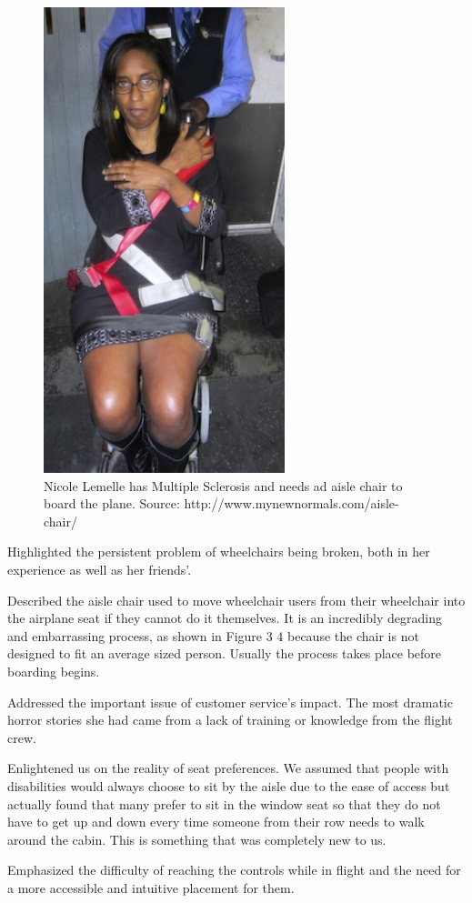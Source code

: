 \documentclass[a4paper, 12pt,conference]{new_cit_thesis}
\begin{document}
\begin{figure}[h]
  \centering
     \includegraphics[width=7cm]{images/image023}
   \caption{Nicole Lemelle has Multiple Sclerosis and needs ad aisle chair to board the plane. Source: http://www.mynewnormals.com/aisle-chair/}
  \label{fig:23}
\end{figure}

\begin{list}{-}{}
  \item Highlighted the persistent problem of wheelchairs being broken, both in her experience as well as her friends'.
  \item Described the aisle chair used to move wheelchair users from their wheelchair into the airplane seat if they cannot do it themselves. It is an incredibly degrading and embarrassing process, as shown in Figure 3 4 because the chair is not designed to fit an average sized person. Usually the process takes place before boarding begins.
  \item Addressed the important issue of customer service's impact. The most dramatic horror stories she had came from a lack of training or knowledge from the flight crew.
  \item Enlightened us on the reality of seat preferences. We assumed that people with disabilities would always choose to sit by the aisle due to the ease of access but actually found that many prefer to sit in the window seat so that they do not have to get up and down every time someone from their row needs to walk around the cabin. This is something that was completely new to us.
  \item Emphasized the difficulty of reaching the controls while in flight and the need for a more accessible and intuitive placement for them. 
\end{list}
\end{document}
